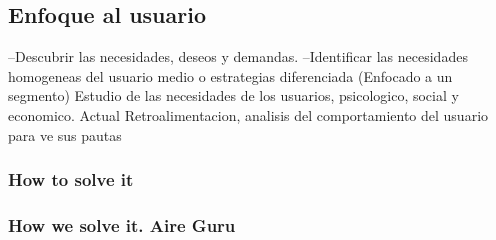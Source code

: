 \subsection{Enfoque al usuario}
--Descubrir las necesidades, deseos y demandas.
--Identificar las necesidades homogeneas del usuario medio o estrategias diferenciada (Enfocado a un segmento)
Estudio de las necesidades de los usuarios, psicologico, social y economico.
Actual
Retroalimentacion, analisis del comportamiento del usuario para ve sus pautas

\subsubsection{How to solve it} 


\subsubsection{How we solve it. Aire Guru} 
 
\begin{itemize}
    \done
    \crossed
    
\end{itemize}
 

\newpage